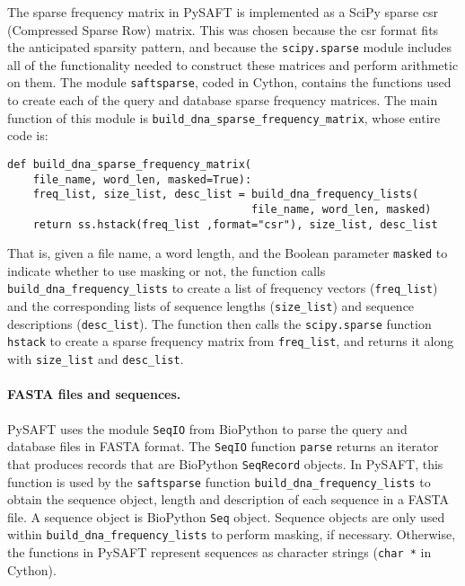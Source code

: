 \documentclass[11pt]{report}
\begin{document}
The sparse frequency matrix in PySAFT is implemented as a SciPy sparse csr (Compressed Sparse Row) matrix.
This was chosen because the csr format fits the anticipated sparsity pattern, and because the 
\newline \verb!scipy.sparse! module includes all of the functionality needed to construct these
matrices and perform arithmetic on them.
The module \verb!saftsparse!, coded in Cython, contains the functions used to create each of the query
and database sparse frequency matrices.
The main function of this module is \verb!build_dna_sparse_frequency_matrix!, whose entire code is:
\begin{verbatim}
def build_dna_sparse_frequency_matrix(
    file_name, word_len, masked=True):
    freq_list, size_list, desc_list = build_dna_frequency_lists(
                                      file_name, word_len, masked)
    return ss.hstack(freq_list ,format="csr"), size_list, desc_list
\end{verbatim}
That is, given a file name, a word length, and the Boolean parameter \verb!masked!
to indicate whether to use masking or not,
the function calls \newline 
\verb!build_dna_frequency_lists! to create a list of frequency vectors 
\newline (\verb!freq_list!)
and the corresponding lists of sequence lengths (\verb!size_list!) and sequence descriptions
(\verb!desc_list!).
The function then calls the 
\newline \verb!scipy.sparse! function \verb!hstack! to create
a sparse frequency matrix from \verb!freq_list!, and returns it along with 
\verb!size_list! and \verb!desc_list!.
\paragraph{FASTA files and sequences.}
PySAFT uses the module \verb!SeqIO! from BioPython to parse the query and database files in
FASTA format.
The \verb!SeqIO! function \verb!parse! returns an iterator 
that produces records that are BioPython \verb!SeqRecord! objects.
In PySAFT, this function is used by the 
\newline \verb!saftsparse! function \verb!build_dna_frequency_lists! 
to obtain the sequence object, length and description of each sequence in a FASTA file.
A sequence object is BioPython \verb!Seq! object.
Sequence objects are only used within 
\newline \verb!build_dna_frequency_lists! to perform masking,
if necessary.
Otherwise, the functions in PySAFT represent sequences as character strings (\verb!char *! in Cython).
\end{document}
